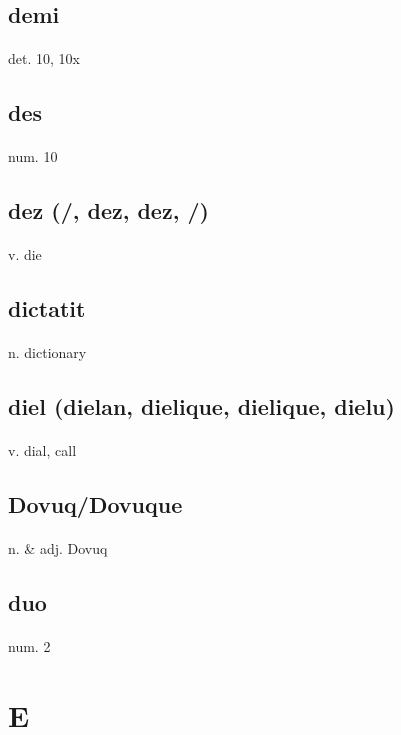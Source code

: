 \documentclass[UTF8]{article}
\begin{document}
    \subsection{demi}
    \paragraph{} det. 10, 10x 
    \subsection{des}
    \paragraph{} num. 10 
    \subsection{dez (/, dez, dez, /)}
    \paragraph{} v. die 
    \subsection{dictatit}
    \paragraph{} n. dictionary 
    \subsection{diel (dielan, dielique, dielique, dielu)}
    \paragraph{} v. dial, call 
    \subsection{Dovuq/Dovuque}
    \paragraph{} n. \& adj. Dovuq 
    \subsection{duo}
    \paragraph{} num. 2 
    \newpage \section{E}
\end{document}
